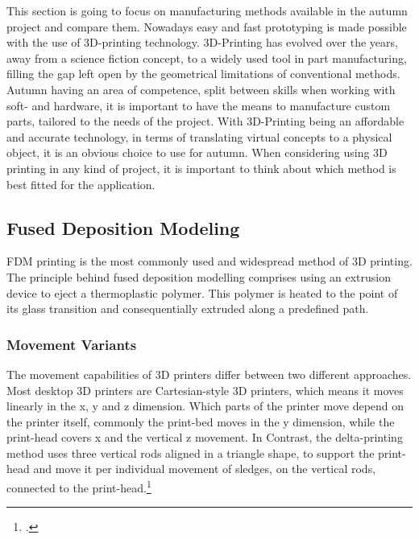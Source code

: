 This section is going to focus on manufacturing methods available in the autumn project and compare them. Nowadays easy and fast prototyping is made possible with the use of 3D-printing technology. 3D-Printing has evolved over the years, away from a science fiction concept, to a widely used tool in part manufacturing, filling the gap left open by the geometrical limitations of conventional methods.\newline
Autumn having an area of competence, split between skills when working with soft- and hardware, it is important to have the means to manufacture custom parts, tailored to the needs of the project. With 3D-Printing being an affordable and accurate technology, in terms of translating virtual concepts to a physical object, it is an obvious choice to use for autumn.
When considering using 3D printing in any kind of project, it is important to think about which method is best fitted for the application.

\subsection{Fused Deposition Modeling}

FDM printing is the most commonly used and widespread method of 3D printing. The principle behind fused deposition modelling comprises using an extrusion device to eject a thermoplastic polymer. This polymer is heated to the point of its glass transition and consequentially extruded along a predefined path.

\subsubsection{Movement Variants}

The movement capabilities of 3D printers differ between two different approaches. Most desktop 3D printers are Cartesian-style 3D printers, which means it moves linearly in the x, y and z dimension.
Which parts of the printer move depend on the printer itself, commonly the print-bed moves in the y dimension, while the print-head covers x and the vertical z movement. In Contrast, the delta-printing method uses three vertical rods aligned in a triangle shape, to support the print-head and move it per individual movement of sledges, on the vertical rods, connected to the print-head.\footcite{all3dpFDM3DPrinting2020}\newline

